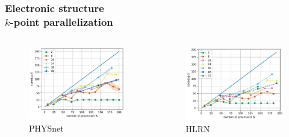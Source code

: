 \documentclass[aspectratio=169]{beamer}
\begin{document}
\begin{frame}
	\frametitle{Electronic structure\\ \(k\)-point parallelization}
	
	\begin{columns}
		\begin{column}{0.5\textwidth}
			\begin{figure}
				\includegraphics[width=\textwidth]{figs/TaS2_intel_bench_nk_speedup.pdf}
				\caption*{PHYSnet}
			\end{figure}
		\end{column}

		\begin{column}{0.5\textwidth}
			\begin{figure}
				\includegraphics[width=\textwidth]{figs/TaS2_hlrn_bench_nk_speedup.pdf}
				\caption*{HLRN}
			\end{figure}
		\end{column}
	\end{columns}

\end{frame}
\end{document}
